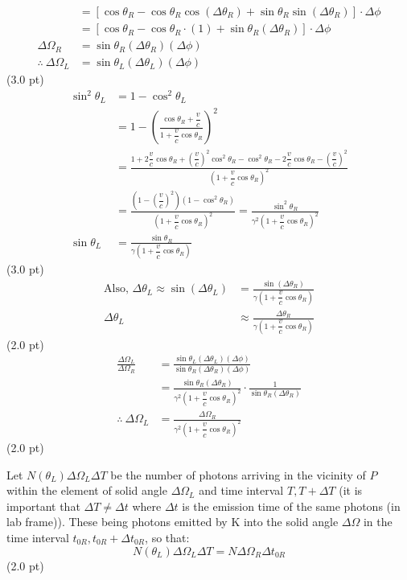 \begin{description}
\begin{align*}
    &= \left[\cos\theta_R - \cos\theta_R\cos(\Delta\theta_R)
       + \sin\theta_R\sin(\Delta\theta_R)\right]\cdot\Delta\phi\\
    &= \left[\cos\theta_R - \cos\theta_R\cdot(1)
       + \sin\theta_R(\Delta\theta_R)\right]\cdot\Delta\phi\\
    \Delta\Omega_R &= \sin\theta_R(\Delta\theta_R)(\Delta\phi)\\
    \therefore\ \Delta\Omega_L &= \sin\theta_L(\Delta\theta_L)(\Delta\phi)
  \end{align*}
  \hfill(3.0 pt)
  \begin{align*}
    \sin^2\theta_L &= 1 - \cos^2\theta_L\\
    &= 1 - \left(\frac{\cos\theta_R + \dfrac{v}{c}}
        {1 + \dfrac{v}{c}\cos\theta_R}\right)^2\\
    &= \frac{1 + 2\dfrac{v}{c}\cos\theta_R
        + \left(\dfrac{v}{c}\right)^2\cos^2\theta_R - \cos^2\theta_R
        - 2\dfrac{v}{c}\cos\theta_R - \left(\dfrac{v}{c}\right)^2}
        {\left(1 + \dfrac{v}{c}\cos\theta_R\right)^2}\\
    &= \frac{\left(1 - \left(\dfrac{v}{c}\right)^2\right)
        \left(1 - \cos^2\theta_R\right)}
        {\left(1 + \dfrac{v}{c}\cos\theta_R\right)^2}
     = \frac{\sin^2\theta_R}
        {\gamma^2\left(1 + \dfrac{v}{c}\cos\theta_R\right)^2}\\
    \sin\theta_L &= \frac{\sin\theta_R}
        {\gamma\left(1 + \dfrac{v}{c}\cos\theta_R\right)}
  \end{align*}
  \hfill(3.0 pt)
  \begin{align*}
    \text{Also, } \Delta\theta_L \approx \sin(\Delta\theta_L)
      &= \frac{\sin(\Delta\theta_R)}
         {\gamma\left(1 + \dfrac{v}{c}\cos\theta_R\right)}\\
    \Delta\theta_L &\approx \frac{\Delta\theta_R}
      {\gamma\left(1 + \dfrac{v}{c}\cos\theta_R\right)}
  \end{align*}
  \hfill(2.0 pt)
  \begin{align*}
    \frac{\Delta\Omega_L}{\Delta\Omega_R}
      &= \frac{\sin\theta_L(\Delta\theta_L)(\Delta\phi)}
              {\sin\theta_R(\Delta\theta_R)(\Delta\phi)}\\
      &= \frac{\sin\theta_R(\Delta\theta_R)}
              {\gamma^2\left(1 + \dfrac{v}{c}\cos\theta_R\right)^2}
         \cdot\frac{1}{\sin\theta_R(\Delta\theta_R)}\\
    \therefore\ \Delta\Omega_L
      &= \frac{\Delta\Omega_R}
              {\gamma^2\left(1 + \dfrac{v}{c}\cos\theta_R\right)^2}
  \end{align*}
  \hfill(2.0 pt)
\item[(e)] Let $N(\theta_L)\Delta\Omega_L\Delta T$ be the number of photons
  arriving in the vicinity of $P$ within the element of solid angle
  $\Delta\Omega_L$ and time interval $T, T + \Delta T$ (it is important that
  $\Delta T \neq \Delta t$ where $\Delta t$ is the emission time of the same
  photons (in lab frame)). These being photons emitted by K into the solid
  angle $\Delta\Omega$ in the time interval $t_{0R}, t_{0R} + \Delta t_{0R}$,
  so that:
  \[ N(\theta_L)\Delta\Omega_L\Delta T = N\Delta\Omega_R\Delta t_{0R} \]
  \hfill(2.0 pt)


\end{description}
